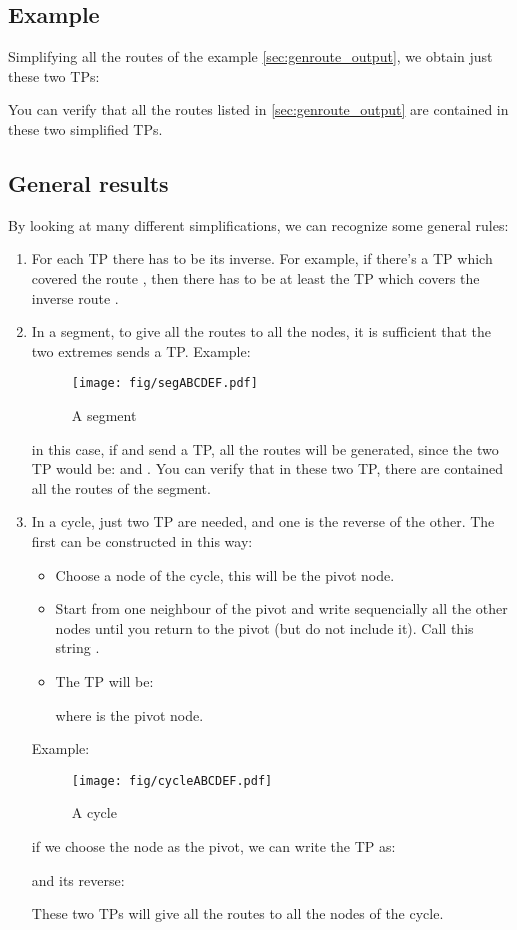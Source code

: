 \documentclass[a4paper]{article}
\begin{document}
\subsection*{Example}
Simplifying all the routes of the example \ref{sec:genroute_output}, we obtain
just these two TPs:


You can verify that all the routes listed in \ref{sec:genroute_output} are
contained in these two simplified TPs.

\subsection{General results}
By looking at many different simplifications, we can recognize some general
rules:
\begin{enumerate}
	\item For each TP there has to be its inverse. For example, if there's
		a TP which covered the route , then there has to be at
		least the TP which covers the inverse route .
	\item In a segment, to give all the routes to all the nodes, it is
		sufficient that the two extremes sends a TP. Example:
		\begin{figure}[h]
			\begin{center}
				\texttt{[image: fig/segABCDEF.pdf]}
			\end{center}
			\caption{A segment}
		\end{figure}
		in this case, if  and  send a TP, all the routes will be
		generated, since the two TP would be:  and .
		You can verify that in these two TP, there are contained all
		the routes of the segment.
	\item In a cycle, just two TP are needed, and one is the reverse of
		the other. The first can be constructed in this way: 
		\begin{itemize}
			\item Choose a node of the cycle, this will be the
				pivot node.
			\item Start from one neighbour of the pivot and write
				sequencially all the other nodes until you
				return to the pivot (but do not include it).
				Call this string .
			\item The TP will be:
				
				where  is the pivot node.
		\end{itemize}
		Example:
		\begin{figure}[h]
			\begin{center}
				\texttt{[image: fig/cycleABCDEF.pdf]}
			\end{center}
			\caption{A cycle}
		\end{figure}
		if we choose the node  as the pivot, we can write the TP
		as:
		
		and its reverse:
		
		These two TPs will give all the routes to all the nodes of the
		cycle.
\end{enumerate}
\end{document}
